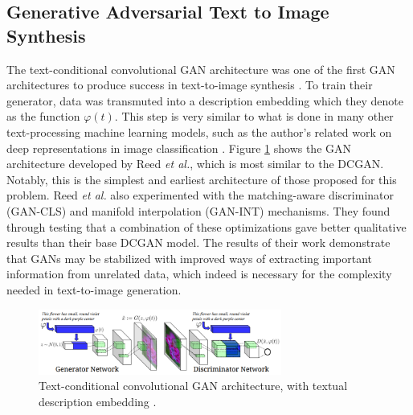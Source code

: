 \documentclass[letterpaper]{article} %
\begin{document}
\subsection{Generative Adversarial Text to Image Synthesis}
The text-conditional convolutional GAN architecture was one of the first 
GAN architectures to produce success in text-to-image synthesis 
\cite{gan_text_to_image}. To train their generator, data was transmuted into a 
description embedding which they denote as the function $\varphi(t)$. This step 
is  very similar to what is done in many other text-processing machine learning 
models, such as the author's related work on deep representations in image 
classification \cite{deep_visual_descriptions}. Figure \ref{fig:cond_gan} shows 
the GAN architecture developed by Reed \textit{et al.}, which is most similar 
to the DCGAN. Notably, this is the simplest and earliest
architecture of those proposed for this problem. Reed \textit{et al.}
also experimented with the matching-aware discriminator (GAN-CLS) and manifold 
interpolation (GAN-INT) mechanisms. They 
found through testing that a combination of these optimizations gave better 
qualitative results than their base DCGAN model.
The results of their work demonstrate that 
GANs may be stabilized with improved ways of extracting important information 
from unrelated data, which indeed is necessary for the complexity needed in 
text-to-image generation.

\begin{figure}[htbp]
\centerline{\includegraphics[width=8cm]{cond_gan.png}}
\caption{Text-conditional convolutional GAN architecture, with textual 
description embedding \cite{gan_text_to_image}.}
\label{fig:cond_gan}
\end{figure}
\end{document}
